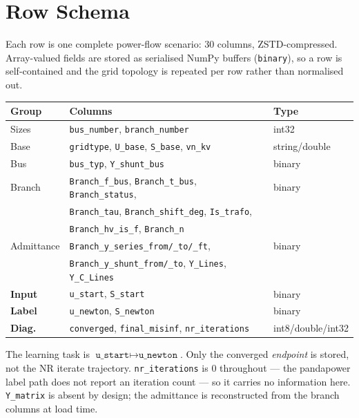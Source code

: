 \documentclass{article}
\begin{document}
\section{Row Schema}

Each row is one complete power-flow scenario: 30 columns, ZSTD-compressed.
Array-valued fields are stored as serialised NumPy buffers (\texttt{binary}),
so a row is self-contained and the grid topology is repeated per row rather
than normalised out.

\begin{center}
\small
\begin{tabular}{lll}
\toprule
\textbf{Group} & \textbf{Columns} & \textbf{Type} \\
\midrule
Sizes    & \texttt{bus\_number}, \texttt{branch\_number} & int32 \\
Base     & \texttt{gridtype}, \texttt{U\_base}, \texttt{S\_base}, \texttt{vn\_kv} & string/double \\
Bus      & \texttt{bus\_typ}, \texttt{Y\_shunt\_bus} & binary \\
Branch   & \texttt{Branch\_f\_bus}, \texttt{Branch\_t\_bus}, \texttt{Branch\_status}, & binary \\
         & \texttt{Branch\_tau}, \texttt{Branch\_shift\_deg}, \texttt{Is\_trafo}, & \\
         & \texttt{Branch\_hv\_is\_f}, \texttt{Branch\_n} & \\
Admittance & \texttt{Branch\_y\_series\_from/\_to/\_ft}, & binary \\
           & \texttt{Branch\_y\_shunt\_from/\_to}, \texttt{Y\_Lines}, \texttt{Y\_C\_Lines} & \\
\midrule
\textbf{Input}  & \texttt{u\_start}, \texttt{S\_start} & binary \\
\textbf{Label}  & \texttt{u\_newton}, \texttt{S\_newton} & binary \\
\textbf{Diag.}  & \texttt{converged}, \texttt{final\_misinf}, \texttt{nr\_iterations} & int8/double/int32 \\
\bottomrule
\end{tabular}
\end{center}

\noindent
The learning task is $\texttt{u\_start} \mapsto \texttt{u\_newton}$.  Only the
converged \emph{endpoint} is stored, not the NR iterate trajectory.
\texttt{nr\_iterations} is $0$ throughout --- the pandapower label path does not
report an iteration count --- so it carries no information here.
\texttt{Y\_matrix} is absent by design; the admittance is reconstructed from the
branch columns at load time.
\end{document}
